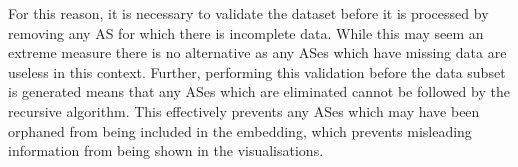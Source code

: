 For this reason, it is necessary to validate the dataset before it is processed by removing any AS for which there is incomplete data. While this may seem an extreme measure there is no alternative as any ASes which have missing data are useless in this context. Further, performing this validation before the data subset is generated means that any ASes which are eliminated cannot be followed by the recursive algorithm. This effectively prevents any ASes which may have been orphaned from being included in the embedding, which prevents misleading information from being shown in the visualisations. 